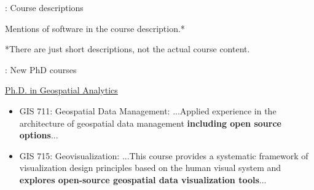 \documentclass[xcolor={dvipsnames,usenames},beamer,aspectratio=169]{beamer}
\begin{document}
\begin{frame}{\coursesTitle: Course descriptions}

Mentions of software in the course description.*


*There are just short descriptions, not the actual course content.

\end{frame}


\begin{frame}{\coursesTitle: New PhD courses}


\begin{block}{\href{https://cnr.ncsu.edu/geospatial/academics/phd-in-geospatial-analytics/}%
  {Ph.D. in Geospatial Analytics}}
\begin{itemize}
 \item GIS 711: Geospatial Data Management:
...Applied experience in the architecture of geospatial data management \textbf{including open source options}...

\item GIS 715: Geovisualization:
...This course provides a systematic framework of visualization design principles based on the human visual system and \textbf{explores open-source geospatial data visualization tools}...
\end{itemize}

\end{block}

\end{frame}
\end{document}
